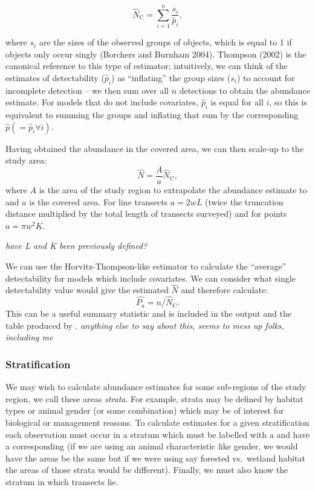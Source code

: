 \documentclass[article]{jss}
\begin{document}
\begin{equation}
\hat{N}_\text{C} = \sum_{i=1}^n\frac{s_i}{\hat{p}_i},
\label{ht}
\end{equation}

where \(s_i\) are the sizes of the observed groups of objects, which is
equal to 1 if objects only occur singly (Borchers and Burnham 2004).
Thompson (2002) is the canonical reference to this type of estimator;
intuitively, we can think of the estimates of detectability
(\(\hat{p}_i\)) as ``inflating'' the group sizes (\(s_i\)) to account
for incomplete detection -- we then sum over all \(n\) detections to
obtain the abundance estimate. For models that do not include
covariates, \(\hat{p}_i\) is equal for all \(i\), so this is equivalent
to summing the groups and inflating that sum by the corresponding
\(\hat{p} (=\hat{p}_i \forall i)\).

Having obtained the abundance in the covered area, we can then scale-up
to the study area: \[
\hat{N} = \frac{A}{a} \hat{N}_\text{C},
\] where \(A\) is the area of the study region to extrapolate the
abundance estimate to and \(a\) is the covered area. For line transects
\(a=2wL\) (twice the truncation distance multiplied by the total length
of transects surveyed) and for points \(a=\pi w^2 K\).

\emph{have L and K been previously defined?}

We can use the Horvitz-Thompson-like estimator to calculate the
``average'' detectability for models which include covariates. We can
consider what single detectability value would give the estimated
\(\hat{N}\) and therefore calculate: \[
\hat{P_a} = n/\hat{N}_\text{C}.
\] This can be a useful summary statistic and is included in the
 output and the table produced by
. \emph{anything else to say about this, seems
to mess up folks, including me}

\subsubsection{Stratification}\label{stratification}

We may wish to calculate abundance estimates for some sub-regions of the
study region, we call these areas \emph{strata}. For example, strata may
be defined by habitat types or animal gender (or some combination) which
may be of interest for biological or management reasons. To calculate
estimates for a given stratification each observation must occur in a
stratum which must be labelled with a  and have a
corresponding  (if we are using an animal characteristic like
gender, we would have the areas be the same but if we were using say
forested vs.~wetland habitat the areas of those strata would be
different). Finally, we must also know the stratum in which transects
lie.
\end{document}
